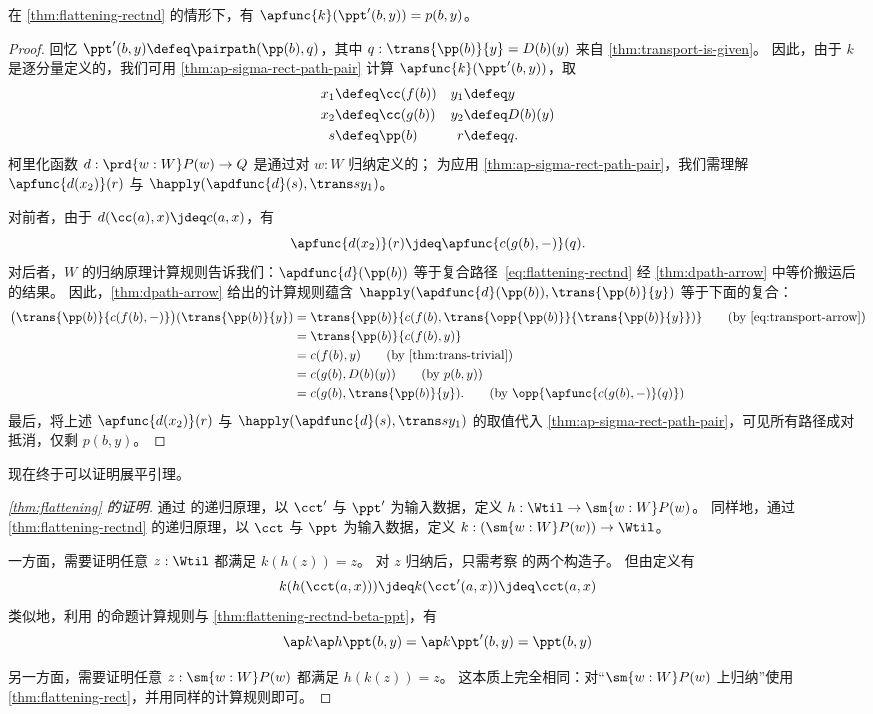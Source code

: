 \begin{lem}\label{thm:flattening-rectnd-beta-ppt}
  在 \cref{thm:flattening-rectnd} 的情形下，有 $\apfunc{k}(\ppt'(b,y)) = p(b,y)$。
\end{lem}
\begin{proof}
  回忆 $\ppt'(b,y) \defeq \pairpath(\pp(b),q)$，其中 $q:\trans{\pp(b)}{y} = D(b)(y)$ 来自 \cref{thm:transport-is-given}。
  因此，由于 $k$ 是逐分量定义的，我们可用 \cref{thm:ap-sigma-rect-path-pair} 计算 $\apfunc{k}(\ppt'(b,y))$，取
  \begin{align*}
    x_1 &\defeq \cc(f(b)) & y_1 &\defeq y\\
    x_2 &\defeq \cc(g(b)) & y_2 &\defeq D(b)(y)\\
    s &\defeq \pp(b)      &   r &\defeq q.
  \end{align*}
  柯里化函数 $d:\prd{w:W} P(w) \to Q$ 是通过对 $w:W$ 归纳定义的；
  为应用 \cref{thm:ap-sigma-rect-path-pair}，我们需理解 $\apfunc{d(x_2)}(r)$ 与 $\happly(\apdfunc{d}(s),\trans s {y_1})$。

  对前者，由于 $d(\cc(a),x)\jdeq c(a,x)$，有
  \[ \apfunc{d(x_2)}(r) \jdeq \apfunc{c(g(b),-)}(q). \]
  对后者，$W$ 的归纳原理计算规则告诉我们：$\apdfunc{d}(\pp(b))$ 等于复合路径~\eqref{eq:flattening-rectnd} 经 \cref{thm:dpath-arrow} 中等价搬运后的结果。
  因此，\cref{thm:dpath-arrow} 给出的计算规则蕴含
  $\happly(\apdfunc{d}(\pp(b)),\trans {\pp(b)}{y})$ 等于下面的复合：
  \begin{align}
    \big(\trans{\pp(b)}{c(f(b),-)}\big)(\trans {\pp(b)}{y})
    &= \trans{\pp(b)}{c(f(b),\trans{\opp {\pp(b)}}{\trans {\pp(b)}{y}})}
    \tag{by~\eqref{eq:transport-arrow}}\\
    &= \trans{\pp(b)}{c(f(b),y)}
    \notag \\
    &= c(f(b),y)
    \tag{by \cref{thm:trans-trivial}}\\
    &= c(g(b),D(b)(y))
   \tag{by $p(b,y)$}\\
    &= c(g(b),\trans{\pp(b)}{y}).
    \tag{by $\opp{\apfunc{c(g(b),-)}(q)}$}
  \end{align}
  最后，将上述 $\apfunc{d(x_2)}(r)$ 与 $\happly(\apdfunc{d}(s),\trans s {y_1})$ 的取值代入 \cref{thm:ap-sigma-rect-path-pair}，可见所有路径成对抵消，仅剩 $p(b,y)$。
\end{proof}

现在终于可以证明展平引理。

\begin{proof}[\cref{thm:flattening} 的证明]
  通过 \Wtil 的递归原理，以 $\cct'$ 与 $\ppt'$ 为输入数据，定义 $h:\Wtil \to \sm{w:W}P(w)$。
  同样地，通过 \cref{thm:flattening-rectnd} 的递归原理，以 $\cct$ 与 $\ppt$ 为输入数据，定义 $k:(\sm{w:W}P(w)) \to \Wtil$。

  一方面，需要证明任意 $z:\Wtil$ 都满足 $k(h(z))=z$。
  对 $z$ 归纳后，只需考察 \Wtil 的两个构造子。
  但由定义有
  \[k(h(\cct(a,x))) \jdeq k(\cct'(a,x)) \jdeq \cct(a,x)\]
  类似地，利用 \Wtil 的命题计算规则与 \cref{thm:flattening-rectnd-beta-ppt}，有
  \[\ap k{\ap h{\ppt(b,y)}} = \ap k{\ppt'(b,y)} = \ppt(b,y) \]

  另一方面，需要证明任意 $z:\sm{w:W}P(w)$ 都满足 $h(k(z))=z$。
  这本质上完全相同：对“$\sm{w:W}P(w)$ 上归纳”使用 \cref{thm:flattening-rect}，并用同样的计算规则即可。
\end{proof}
